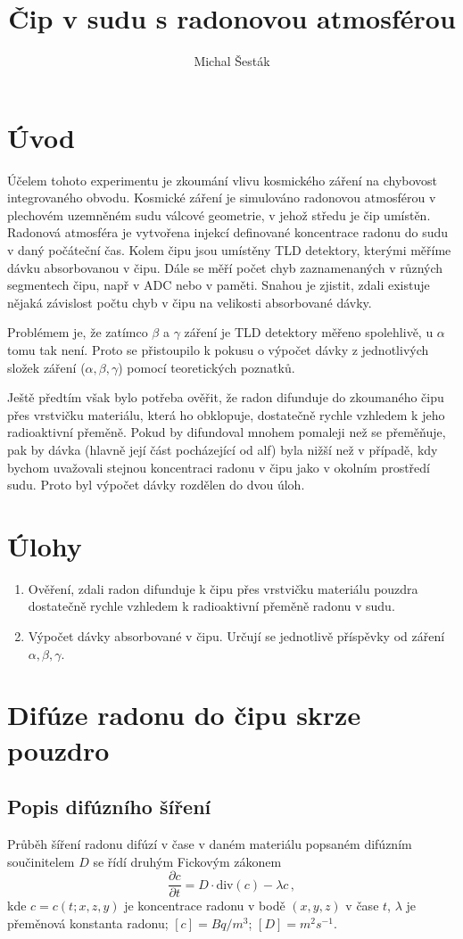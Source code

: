 \documentclass[11pt,a4paper]{article}
\author{Michal Šesták}
\title{Čip v sudu s radonovou atmosférou}
\begin{document}
\maketitle	
\tableofcontents
\section{Úvod}
Účelem tohoto experimentu je zkoumání vlivu kosmického záření na chybovost integrovaného obvodu. Kosmické záření je simulováno radonovou atmosférou v plechovém uzemněném sudu válcové geometrie, v jehož středu je čip umístěn. Radonová atmosféra je vytvořena injekcí definované koncentrace radonu do sudu v daný počáteční čas. Kolem čipu jsou umístěny TLD detektory, kterými měříme dávku absorbovanou v čipu. Dále se měří počet chyb zaznamenaných v různých segmentech čipu, např v ADC nebo v paměti. Snahou je zjistit, zdali existuje nějaká závislost počtu chyb v čipu na velikosti absorbované dávky.

Problémem je, že zatímco $\beta$ a $\gamma$ záření je TLD detektory měřeno spolehlivě, u $\alpha$ tomu tak není. Proto se přistoupilo k pokusu o výpočet dávky z jednotlivých složek záření ($\alpha, \beta, \gamma$) pomocí teoretických poznatků. 

Ještě předtím však bylo potřeba ověřit, že radon difunduje do zkoumaného čipu přes vrstvičku materiálu, která ho obklopuje, dostatečně rychle vzhledem k jeho radioaktivní přeměně. Pokud by difundoval mnohem pomaleji než se přeměňuje, pak by dávka (hlavně její část pocházející od alf) byla nižší než v případě, kdy bychom uvažovali stejnou koncentraci radonu v čipu jako v okolním prostředí sudu. Proto byl výpočet dávky rozdělen do dvou úloh.
\section{Úlohy}
\begin{enumerate}
	\item Ověření, zdali radon difunduje k čipu přes vrstvičku materiálu pouzdra dostatečně rychle vzhledem k radioaktivní přeměně radonu v sudu.
	\item Výpočet dávky absorbované v čipu. Určují se jednotlivě příspěvky od záření $\alpha, \beta, \gamma$.
\end{enumerate}
\section{Difúze radonu do čipu skrze pouzdro}
\subsection{Popis difúzního šíření}
Průběh šíření radonu difúzí v čase v daném materiálu popsaném difúzním součinitelem $D$ se řídí druhým Fickovým zákonem
\begin{equation}
\frac{\partial c}{\partial t}=D\cdot \text{div}(c)-\lambda c\,,\label{eq:fickuvLawObecne}
\end{equation}
kde $c=c(t;x,z,y)$ je koncentrace radonu v bodě $(x,y,z)$ v čase $t$, $\lambda$ je přeměnová konstanta radonu; $[c]=\si{Bq/m^3}$; $[D]=\si{m^2s^{-1}}$. 
\end{document}
